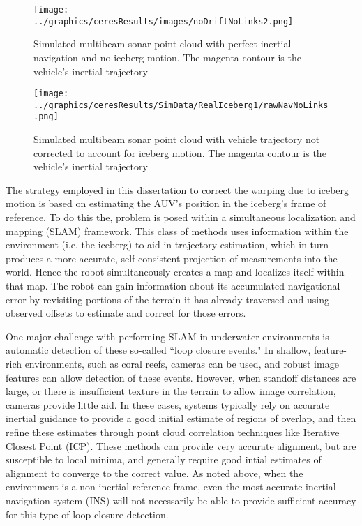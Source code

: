 \begin{figure}[!htb]
   \centering
   \texttt{[image: ../graphics/ceresResults/images/noDriftNoLinks2.png]} %
   \caption{Simulated multibeam sonar point cloud with perfect inertial navigation and no iceberg motion. The magenta contour is the vehicle's inertial trajectory}
   \label{fig:idealMap}
\end{figure}

\begin{figure}[!htb]
   \centering
   \texttt{[image: ../graphics/ceresResults/SimData/RealIceberg1/rawNavNoLinks.png]} %
   \caption{Simulated multibeam sonar point cloud with vehicle trajectory not corrected to account for iceberg motion. The magenta contour is the vehicle's inertial trajectory}
   \label{fig:Challenge}
\end{figure}

The strategy employed in this dissertation to correct the warping due to iceberg motion is based on estimating the AUV's position in the iceberg's frame of reference. To do this the, problem is posed within a simultaneous localization and mapping (SLAM) framework. This class of methods uses information within the environment (i.e. the iceberg) to aid in trajectory estimation, which in turn produces a more accurate, self-consistent projection of measurements into the world. Hence the robot simultaneously creates a map and localizes itself within that map. The robot can gain information about its accumulated navigational error by revisiting portions of the terrain it has already traversed and using observed offsets to estimate and correct for those errors. 

One major challenge with performing SLAM in underwater environments is automatic detection of these so-called ``loop closure events." In shallow, feature-rich environments, such as coral reefs, cameras can be used, and robust image features can allow detection of these events. However, when standoff distances are large, or there is insufficient texture in the terrain to allow image correlation, cameras provide little aid. In these cases, systems typically rely on accurate inertial guidance to provide a good initial estimate of regions of overlap, and then refine these estimates through point cloud correlation techniques like Iterative Closest Point (ICP). These methods can provide very accurate alignment, but are susceptible to local minima, and generally require good intial estimates of alignment to converge to the correct value. As noted above, when the environment is a non-inertial reference frame, even the most accurate inertial navigation system (INS) will not necessarily be able to provide sufficient accuracy for this type of loop closure detection. 

